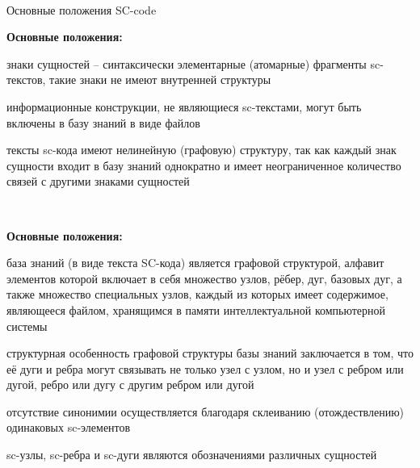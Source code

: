 \begin{frame}{\\Основные положения SC-code}
	\vspace{5mm}
	\begin{SCn}
		\vspace{5mm}
		\textbf{Основные положения:}
		\begin{textitemize}
			\item{знаки сущностей --  синтаксически элементарные (атомарные) фрагменты sc-текстов, такие знаки не имеют внутренней структуры}
			\item{информационные конструкции, не являющиеся sc-текстами, могут быть включены в базу знаний в виде файлов}
			\item{тексты sc-кода имеют нелинейную (графовую) структуру, так как каждый знак сущности входит в базу знаний однократно и имеет неограниченное количество связей с другими знаками сущностей}
		\end{textitemize}
	\end{SCn}
\end{frame}

\begin{frame}{\\}
	\begin{SCn}
		\textbf{Основные положения:}
		\begin{textitemize}
			\item{база знаний (в виде текста SC-кода) является графовой структурой, алфавит элементов которой включает в себя множество узлов, рёбер, дуг, базовых дуг, а также множество специальных узлов, каждый из которых имеет содержимое, являющееся файлом, хранящимся в памяти интеллектуальной компьютерной системы}
			\item{структурная особенность графовой структуры базы знаний заключается в том, что её дуги и ребра могут связывать не только узел с узлом, но и узел с ребром или дугой, ребро или дугу с другим ребром или дугой}
			\item{отсутствие синонимии осуществляется благодаря склеиванию (отождествлению) одинаковых sc-элементов}
			\item{sc-узлы, sc-ребра и sc-дуги являются обозначениями различных сущностей}
		\end{textitemize}
	\end{SCn}
\end{frame}

